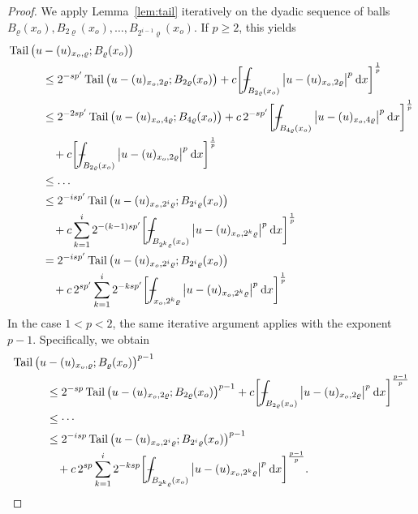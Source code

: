 \documentclass[10pt,letterpaper]{amsart}
\theoremstyle{definition}
\numberwithin{theorem}{section}
\numberwithin{equation}{section}
\newcommand{\1}{\ensuremath{\mathds{1}}}
\def\Xint#1{\mathchoice
    {\XXint\displaystyle\textstyle{#1}}%
    {\XXint\textstyle\scriptstyle{#1}}%
    {\XXint\scriptstyle\scriptscriptstyle{#1}}%
    {\XXint\scriptscriptstyle\scriptscriptstyle{#1}}%
    \!\int}
\def\XXint#1#2#3{\setbox0=\hbox{$#1{#2#3}{\int}$}
    \vcenter{\hbox{$#2#3$}}\kern-0.5\wd0}
\def\bint{\Xint-}
\renewcommand{\rho}{\varrho}
\renewcommand{\rho}{\varrho}
\renewcommand{\d}{\:\! \mathrm{d}}
\DeclareMathOperator{\Tail}{Tail}
\numberwithin{equation}{section}
\begin{document}
\begin{proof}
We apply Lemma~\ref{lem:tail} iteratively on the dyadic sequence of balls
\(B_\rho(x_o), B_{2\rho}(x_o), \dots, B_{2^{i-1}\rho}(x_o)\).
If \(p\ge 2\), this yields
\begin{align*}
    \Tail \big(u&-(u)_{x_o,\rho}; B_\rho(x_o)\big) \\
    &\le 
    2^{-sp'} \Tail \big(u-(u)_{x_o,2\rho}; B_{2\rho}(x_o)\big) + 
    c \bigg[ \bint_{B_{2\rho}(x_o)} \big|u-(u)_{x_o,2\rho}\big|^{p} \, \d x \bigg]^\frac{1}{p} \\
    &\le 
    2^{-2sp'} \Tail \big(u-(u)_{x_o,4\rho}; B_{4\rho}(x_o)\big) + 
    c\,2^{-sp'}
    \bigg[ \bint_{B_{4\rho}(x_o)} \big|u-(u)_{x_o,4\rho}\big|^{p} \, \d x \bigg]^\frac{1}{p} \\
    &\phantom{\le\,} +
    c \bigg[ \bint_{B_{2\rho}(x_o)} \big|u-(u)_{x_o,2\rho}\big|^{p} \, \d x \bigg]^\frac{1}{p} \\
    &\le 
    \dots \\
    &\le 
    2^{-isp'} \Tail \big(u-(u)_{x_o,2^i\rho}; B_{2^i\rho}(x_o)\big) \\
    &\phantom{\le\,} +  
    c \sum_{k=1}^{i} 2^{-(k-1)sp'} 
    \bigg[ \bint_{B_{2^k\rho}(x_o)} \big|u-(u)_{x_o,2^k\rho}\big|^{p} \, \d x \bigg]^\frac{1}{p} \\
    &=
    2^{-isp'} \Tail \big(u-(u)_{x_o,2^i\rho}; B_{2^i\rho}(x_o)\big) \\
    &\phantom{\le\,} +  
    c\,2^{sp'} \sum_{k=1}^{i} 2^{-ksp'} \bigg[ \bint_{x_o,2^k\rho} \big|u-(u)_{x_o,2^k\rho}\big|^{p} \, \d x \bigg]^\frac{1}{p}
\end{align*}
In the case \(1<p<2\), the same iterative argument applies with the exponent \(p-1\). 
Specifically, we obtain
\begin{align*}
    \Tail \big(u&-(u)_{x_o,\rho}; B_\rho(x_o)\big)^{p-1} \\
    &\le 
    2^{-sp} \Tail \big(u-(u)_{x_o,2\rho}; B_{2\rho}(x_o)\big)^{p-1} + 
    c
    \bigg[ \bint_{B_{2\rho}(x_o)} \big|u-(u)_{x_o,2\rho}\big|^{p} \, \d x \bigg]^\frac{p-1}{p} \\
    &\le 
    \cdots \\
    &\le 
    2^{-isp} \Tail \big(u-(u)_{x_o,2^i\rho}; B_{2^i\rho}(x_o)\big)^{p-1} \\
    &\phantom{\le\,} +  
    c\,2^{sp} \sum_{k=1}^{i} 2^{-ksp} \bigg[ \bint_{B_{2^k\rho}(x_o)} \big|u-(u)_{x_o,2^k\rho}\big|^{p} \, \d x \bigg]^\frac{p-1}{p}.
\end{align*}
\end{proof}
\end{document}
